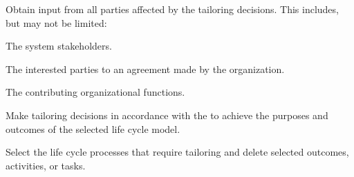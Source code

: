 \begin{adjustwidth}{0.5em}{0pt}
\begin{compactenum}
			\item Obtain input from all parties affected by the tailoring decisions. This includes, but may not be limited:

			\begin{compactenum}

				\item The system stakeholders.

				\item The interested parties to an agreement made by the organization.

				\item The contributing organizational functions.

			\end{compactenum}

			\item Make tailoring decisions in accordance with the  to achieve the purposes and outcomes of the selected life cycle model.

			\item Select the life cycle processes that require tailoring and delete selected outcomes, activities, or tasks.
		\end{compactenum}

	\end{adjustwidth}

